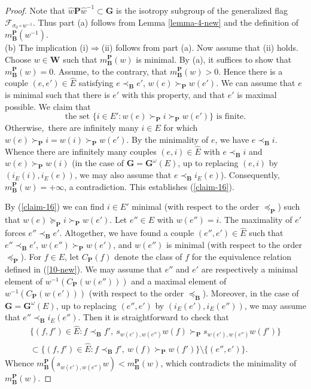 \documentclass[12pt]{amsart}
\theoremstyle{definition}
\begin{document}
\begin{proof}
Note that $\hat{w}\mathbf{P}\hat{w}^{-1}\subset\mathbf{G}$ is the isotropy subgroup of the generalized flag $\mathcal{F}_{\sigma_0\circ w^{-1}}$.
Thus part {\rm (a)} follows from Lemma \ref{lemma-4-new} and the definition of  $m_\mathbf{B}^\mathbf{P}(w^{-1})$. \\
{\rm (b)} The implication {\rm (i)}$\Rightarrow${\rm (ii)} follows from part {\rm (a)}. Now assume that {\rm (ii)} holds. Choose $w\in\mathbf{W}$ such that $m_\mathbf{B}^\mathbf{P}(w)$ is minimal.
By {\rm (a)}, it suffices to show that $m_\mathbf{B}^\mathbf{P}(w)=0$.
Assume, to the contrary, that $m_\mathbf{B}^\mathbf{P}(w)>0$.
Hence there is a couple $(e,e')\in\hat{E}$ satisfying $e\prec_\mathbf{B}e'$, $w(e)\succ_\mathbf{P}w(e')$. We can assume that $e$ is minimal such that there is $e'$ with this property, and that $e'$ is maximal possible.
We claim that
\begin{equation}
\label{claim-16}
\mbox{the set $\{i\in E':w(e)\succ_\mathbf{P}i\succ_\mathbf{P}w(e')\}$ is finite.}
\end{equation}
Otherwise,\ there are infinitely many $i\in E$ for which $w(e)\succ_\mathbf{P}i=w(i)\succ_\mathbf{P}w(e')$. By the minimality of $e$, we have $e\prec_\mathbf{B}i$. Whence there are infinitely many couples $(e,i)\in\hat{E}$ with $e\prec_\mathbf{B}i$ and $w(e)\succ_\mathbf{P}w(i)$ (in the case of $\mathbf{G}=\mathbf{G}^\omega(E)$, up to replacing $(e,i)$ by $(i_E(i),i_E(e))$, we may also assume that $e\prec_\mathbf{B}i_E(e)$). Consequently, $m_\mathbf{B}^\mathbf{P}(w)=+\infty$, a contradiction. This establishes (\ref{claim-16}).

By (\ref{claim-16}) we can find $i\in E'$ minimal (with respect to the order $\preceq_\mathbf{P}$) such that $w(e)\succeq_\mathbf{P}i\succ_\mathbf{P}w(e')$. Let $e''\in E$ with $w(e'')=i$. The maximality of $e'$ forces $e''\prec_\mathbf{B}e'$.
Altogether, we have found a couple $(e'',e')\in\hat{E}$ such that $e''\prec_\mathbf{B}e'$, $w(e'')\succ_\mathbf{P}w(e')$, and $w(e'')$ is minimal  (with respect to the order $\preceq_\mathbf{P}$).
For $f\in E$, let $C_\mathbf{P}(f)$ denote the class of $f$ for the equivalence relation defined in (\ref{10-new}).
We may assume that $e''$ and $e'$ are respectively a minimal element of $w^{-1}(C_\mathbf{P}(w(e'')))$ and a maximal element of $w^{-1}(C_\mathbf{P}(w(e')))$ (with respect to the order $\preceq_\mathbf{B}$).
Moreover, in the case of $\mathbf{G}=\mathbf{G}^\omega(E)$, up to replacing $(e'',e')$ by $(i_E(e'),i_E(e''))$, we may assume that $e''\prec_\mathbf{B}i_E(e'')$.
Then it is straightforward to check that
\begin{eqnarray*}
  \{(f,f')\in\hat{E}:f\prec_\mathbf{B}f',\ s_{w(e'),w(e'')}w(f)\succ_\mathbf{P} s_{w(e'),w(e'')}w(f')\} \\ \subset \{(f,f')\in\hat{E}: f\prec_\mathbf{B}f',\ w(f)\succ_\mathbf{P}w(f')\}\setminus\{(e'',e')\}.
\end{eqnarray*}
Whence $m_\mathbf{B}^\mathbf{P}(s_{w(e'),w(e'')}w)<m_\mathbf{B}^\mathbf{P}(w)$, which contradicts the minimality of $m_\mathbf{B}^\mathbf{P}(w)$.
\end{proof}
\end{document}
